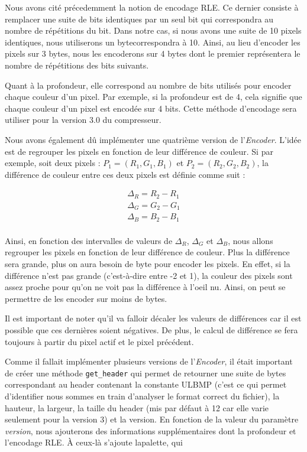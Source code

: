 \documentclass[utf8]{article}
\begin{document}
Nous avons cité précedemment la notion de encodage RLE. Ce dernier consiste à remplacer une suite de bits identiques par un seul bit qui correspondra au nombre de répétitions du bit. Dans notre cas, si nous avons une suite de 10 pixels identiques, nous utiliserons un bytecorrespondra à 10. Ainsi, au lieu d'encoder les pixels sur 3 bytes, nous les encoderons sur 4 bytes dont le premier représentera le nombre de répétitions des bits suivants.

Quant à la profondeur, elle correspond au nombre de bits utilisés pour encoder chaque couleur d'un pixel. Par exemple, si la profondeur est de 4, cela signifie que chaque couleur d'un pixel est encodée sur 4 bits. Cette méthode d'encodage sera utiliser pour la version 3.0 du compresseur. 

Nous avons également dû implémenter une quatrième  version de l'\textit{Encoder}. L'idée est de regrouper les pixels en fonction de leur différence de couleur. Si par exemple, soit deux pixels : $P_1 = (R_1, G_1, B_1)$ et $P_2 = (R_2, G_2, B_2)$, la différence de couleur entre ces deux pixels est définie comme suit : 

\begin{align*}
		\Delta_R = R_2 - R_1 \\
		\Delta_G = G_2 - G_1 \\
		\Delta_B =  B_2 - B_1 \\
\end{align*}

Ainsi, en fonction des intervalles de valeurs de $\Delta_R$, $\Delta_G$ et $\Delta_B$, nous allons regrouper les pixels en fonction de leur différence de couleur. Plus la différence sera grande, plus on aura besoin de byte pour encoder les pixels. En effet, si la différence n'est pas grande (c'est-à-dire entre -2 et 1), la couleur des pixels sont assez proche pour qu'on ne voit pas la différence à l'oeil nu. Ainsi, on peut se permettre de les encoder sur moins de bytes.

Il est important de noter qu'il va falloir décaler les valeurs de différences car il est possible que ces dernières soient négatives. De plus, le calcul de différence se fera toujours à partir du pixel actif et le pixel précédent.

Comme il fallait implémenter plusieurs versions de l'\textit{Encoder}, il était important de créer une méthode \texttt{get_header} qui permet de retourner une suite de bytes correspondant au header contenant la constante ULBMP (c'est ce qui permet d'identifier nous sommes en train d'analyser le format correct du fichier), la hauteur, la largeur, la taille du header (mis par défaut à 12 car elle varie seulement pour la version 3) et la version. En fonction de la valeur du paramètre \textit{version}, nous ajouterons des informations supplémentaires dont la profondeur et l'encodage RLE. À ceux-là s'ajoute lapalette, qui 
\end{document}
